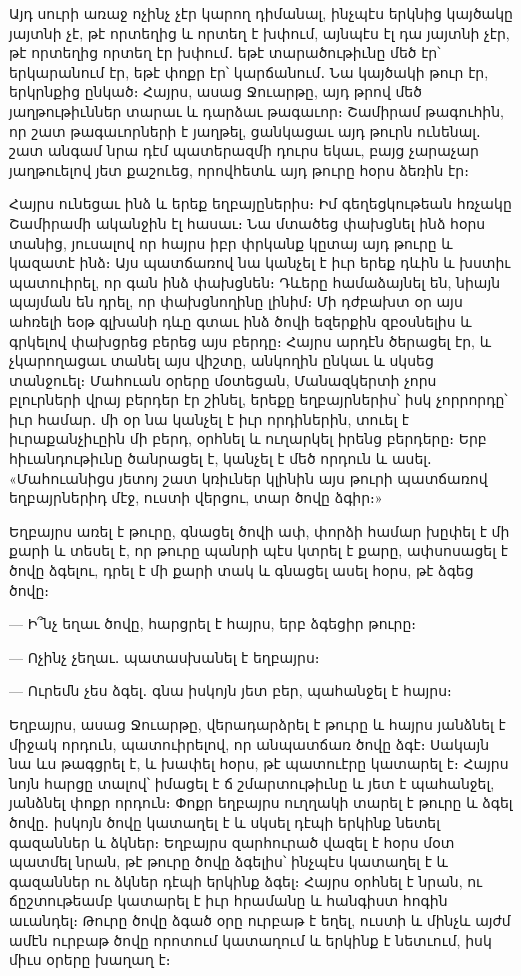\documentclass{article}
\begin{document}
{Այդ սուրի առաջ ոչինչ չէր կարող դիմանալ, ինչպէս երկնից կայծակը յայտնի չէ, թէ որտեղից և որտեղ է խփում, այնպէս էլ դա յայտնի չէր, թէ որտեղից որտեղ էր խփում․ եթէ տարածութիւնը մեծ էր՝ երկարանում էր, եթէ փոքր էր՝ կարճանում․ Նա կայծակի թուր էր, երկրնքից ընկած։ Հայրս, ասաց Ջուարթը, այդ թրով մեծ յաղթութիւններ տարաւ և դարձաւ թագաւոր։ Շամիրամ թագուհին, որ շատ թագաւորների է յաղթել, ցանկացաւ այդ թուրն ունենալ․ շատ անգամ նրա դէմ պատերազմի դուրս եկաւ, բայց չարաչար յաղթուելով յետ քաշուեց, որովհետև այդ թուրը հօրս ձեռին էր։

Հայրս ունեցաւ ինձ և երեք եղբայըներիս։ Իմ գեղեցկութեան հռչակը Շամիրամի ականջին էլ հասաւ։ Նա մտածեց փախցնել ինձ հօրս տանից, յուսալով որ հայրս իբր փրկանք կըտայ այդ թուրը և կազատէ ինձ։ Այս պատճառով նա կանչել է իւր երեք դևին և խստիւ պատուիրել, որ գան ինձ փախցնեն։ Դևերը համաձայնել են, նիայն պայման են դրել, որ փախցնողինը լինիմ։ Մի դժբախտ օր այս ահռելի եօթ գլխանի դևը գտաւ ինձ ծովի եզերքին զբօսնելիս և գրկելով փախցրեց բերեց այս բերդը։ Հայրս արդէն ծերացել էր, և չկարողացաւ տանել այս վիշտը, անկողին ընկաւ և սկսեց տանջուել։ Մահուան օրերը մօտեցան, Մանազկերտի չորս բլուրների վրայ բերդեր էր շինել, երեքը եղբայրներիս՝ իսկ չորրորդը՝ իւր համար․ մի օր նա կանչել է իւր որդիներին, տուել է իւրաքանչիւըին մի բերդ, օրհնել և ուղարկել իրենց բերդերը։ Երբ հիւանդութիւնը ծանրացել է, կանչել է մեծ որդուն և ասել․ «Մահուանիցս յետոյ շատ կռիւներ կլինին այս թուրի պատճառով եղբայրներիդ մէջ, ուստի վերցու, տար ծովը ձգիր։»

Եղբայրս առել է թուրը, գնացել ծովի ափ, փորձի համար խըփել է մի քարի և տեսել է, որ թուրը պանրի պէս կտրել է քարը, ափսոսացել է ծովը ձգելու, դրել է մի քարի տակ և գնացել ասել հօրս, թէ ձգեց ծովը։

— Ի՞նչ եղաւ ծովը, հարցրել է հայրս, երբ ձգեցիր թուրը։

— Ոչինչ չեղաւ․ պատասխանել է եղբայրս։

— Ուրեմն չես ձգել․ գնա իսկոյն յետ բեր, պահանջել է հայրս։

Եղբայրս, ասաց Ջուարթը, վերադարձրել է թուրը և հայրս յանձնել է միջակ որդուն, պատուիրելով, որ անպատճառ ծովը ձգէ։ Սակայն նա ևս թագցրել է, և խափել հօրս, թէ պատուէրը կատարել է։ Հայրս նոյն հարցը տալով՝ իմացել է ճ շմարտութիւնը և յետ է պահանջել, յանձնել փոքր որդուն։ Փոքր եղբայրս ուղղակի տարել է թուրը և ձգել ծովը․ իսկոյն ծովը կատաղել է և սկսել դէպի երկինք նետել գազաններ և ձկներ։ Եղբայրս զարհուրած վազել է հօրս մօտ պատմել նրան, թէ թուրը ծովը ձգելիս՝ ինչպէս կատաղել է և գազաններ ու ձկներ դէպի երկինք ձգել։ Հայրս օրհնել է նրան, ու ճըշտութեամբ կատարել է իւր հրամանը և հանգիստ հոգին աւանդել։ Թուրը ծովը ձգած օրը ուրբաթ է եղել, ուստի և մինչև այժմ ամէն ուրբաթ ծովը որոտում կատաղում և երկինք է նետւում, իսկ միւս օրերը խաղաղ է։

}
\end{document}
